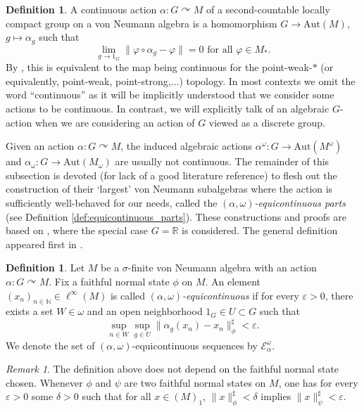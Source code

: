 \documentclass[11pt,a4paper]{article}
\theoremstyle{definition}
\newtheorem{definition}[theorem]{Definition}
\theoremstyle{remark}
\newtheorem{remark}[theorem]{Remark}
\numberwithin{equation}{section}
\numberwithin{theorem}{section}
\newcommand{\R}{\mathbb{R}}
\newcommand{\N}{\mathbb{N}}
\newcommand{\acts}{\curvearrowright}
\newcommand{\e}{\varepsilon}
\begin{document}
\begin{definition}
A continuous action $\alpha\colon G \acts M$ of a second-countable locally compact group on a von Neumann algebra is a homomorphism $G \to \mathrm{Aut}(M)$, $g \mapsto \alpha_g$ such that
\[
\lim_{g \rightarrow 1_G}\|\varphi \circ \alpha_g - \varphi\|=0 \text{ for all } \varphi \in M_*.
\]
By \cite[Proposition~X.1.2]{Takesaki03}, this is equivalent to the map being continuous for the point-weak-$*$ (or equivalently, point-weak, point-strong,$\hdots$) topology.
In most contexts we omit the word ``continuous'' as it will be implicitly understood that we consider some actions to be continuous.
In contrast, we will explicitly talk of an algebraic $G$-action when we are considering an action of $G$ viewed as a discrete group.
\end{definition}

Given an action $\alpha\colon G \acts M$, the induced algebraic actions $\alpha^\omega\colon G \rightarrow \mathrm{Aut}(M^\omega)$ and $\alpha_\omega \colon G \rightarrow \mathrm{Aut}(M_\omega)$ are usually not continuous.
The remainder of this subsection is devoted (for lack of a good literature reference) to flesh out the construction of their `largest' von Neumann subalgebras where the action is sufficiently well-behaved for our needs, called the \emph{$(\alpha, \omega)$-equicontinuous parts} (see Definition \ref{def:equicontinuous_parts}).
These constructions and proofs are based on \cite[Section 3]{MasudaTomatsu16}, where the special case $G=\R$ is considered. The general definition appeared first in \cite[2.1]{Tomatsu17}. 

\begin{definition}
Let $M$ be a $\sigma$-finite von Neumann algebra with an action $\alpha\colon G \acts M$.
Fix a faithful normal state $\phi$ on $M$. An element $(x_n)_{n \in \N} \in \ell^\infty(M)$ is called \emph{$(\alpha, \omega)$-equicontinuous} if for every $\e>0$, there exists a set $W \in \omega$ and an open neighborhood $1_G\in U \subset G$ such that
\[
\sup_{n\in W} \sup_{g\in U} \|\alpha_g(x_n) - x_n\|_\phi^\sharp < \e .
\]
We denote the set of $(\alpha, \omega)$-equicontinuous sequences by $\mathcal{E}^\omega_\alpha$.
\end{definition}

\begin{remark}
The definition above does not depend on the faithful normal state chosen.
Whenever $\phi$ and $\psi$ are two faithful normal states on $M$, one has for every $\e>0$ some $\delta>0$ such that for all $x \in (M)_1$, $\|x\|_\phi^\sharp < \delta$ implies $\|x\|_\psi^\sharp < \e$. 
\end{remark}
\end{document}
